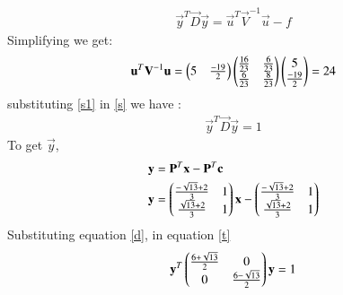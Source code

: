 \documentclass[journal,12pt,twocolumn]{IEEEtran}
\begin{document}
\begin{align}\label{s}
    \vec{y}^T\vec{D}\vec{y}=\vec{u}^T\vec{V}^{-1}\vec{u}-f
\end{align}
Simplifying we get:
\begin{align}\label{s1}
\mathbf{u}^T\mathbf{V}^{-1}\mathbf{u}=
\begin{pmatrix}
5 &\frac{-19}{2}
\end{pmatrix}
\begin{pmatrix}
\frac{16}{23} & \frac{6}{23}\\
\frac{6}{23} & \frac{8}{23}
\end{pmatrix}
\begin{pmatrix}
5\\\frac{-19}{2}
\end{pmatrix}
=24
\end{align}
substituting \eqref{s1} in \eqref{s} we have :
\begin{align}\label{t}
 \vec{y}^T\vec{D}\vec{y}=1  
\end{align}
To get $\vec{y}$,
\begin{align}
\mathbf{y}&=\mathbf{P}^T\mathbf{x}-\mathbf{P}^T\mathbf{c}\\
    \mathbf{y}&=\begin{pmatrix}\frac{-\sqrt{13}+2}{3} & 1 \\ \frac{\sqrt{13}+2}{3} & 1\end{pmatrix}
    \mathbf{x}-\begin{pmatrix}\frac{-\sqrt{13}+2}{3} & 1\\ \frac{\sqrt{13}+2}{3} & 1\end{pmatrix}
\end{align}
Substituting  equation \eqref{d}, in equation \eqref{t} 
\begin{align}
    \mathbf{y}^T \begin{pmatrix}
    \frac{6+\sqrt{13}}{2} & 0\\
     0 &\frac{6-\sqrt{13}}{2}
    \end{pmatrix}\mathbf{y}=1
\end{align}
\end{document}
